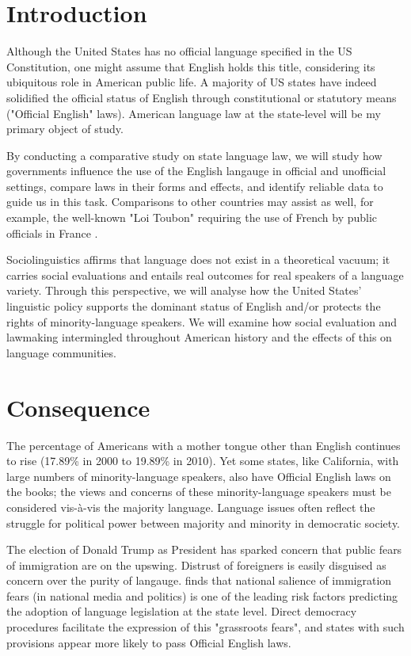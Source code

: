 \documentclass{article}
\begin{document}
\section*{Introduction}

Although the United States has no official language specified in the US
Constitution, one might assume that English holds this title, considering its
ubiquitous role in American public life. A majority of US states have indeed
solidified the official status of English through constitutional or statutory
means ("Official English" laws). American language law at the state-level will
be my primary object of study.

By conducting a comparative study on state language law, we will study how
governments influence the use of the English langauge in official and unofficial
settings, compare laws in their forms and effects, and identify reliable data to
guide us in this task. Comparisons to other countries may assist as well, for
example, the well-known "Loi Toubon" requiring the use of French by public
officials in France \parencite{Calvet96}.

Sociolinguistics affirms that language does not exist in a theoretical vacuum;
it carries social evaluations and entails real outcomes for real speakers of a
language variety. Through this perspective, we will analyse how the United
States' linguistic policy supports the dominant status of English and/or
protects the rights of minority-language speakers. We will examine how social
evaluation and lawmaking intermingled throughout American history and the
effects of this on language communities.

\section*{Consequence}

The percentage of Americans with a mother tongue other than English continues to
rise (17.89\% in 2000 to 19.89\% in 2010). Yet some states, like California,
with large numbers of minority-language speakers, also have Official English
laws on the books; the views and concerns of these minority-language speakers
must be considered vis-à-vis the majority language. Language issues often
reflect the struggle for political power between majority and minority in
democratic society.

The election of Donald Trump as President has sparked concern that public fears
of immigration are on the upswing. Distrust of foreigners is easily disguised as
concern over the purity of langauge. \textcite{Liu14} finds that national
salience of immigration fears (in national media and politics) is one of the
leading risk factors predicting the adoption of language legislation at the
state level. Direct democracy procedures facilitate the expression of this
"grassroots fears", and states with such provisions appear more likely to pass
Official English laws.
\end{document}
